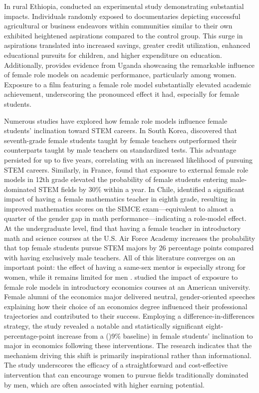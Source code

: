 In rural Ethiopia, \citet{bernard_future_nodate} conducted an experimental study demonstrating substantial impacts. Individuals randomly exposed to documentaries depicting successful agricultural or business endeavors within communities similar to their own exhibited heightened aspirations compared to the control group. This surge in aspirations translated into increased savings, greater credit utilization, enhanced educational pursuits for children, and higher expenditure on education.
Additionally, \citet{riley_role_2024} provides evidence from Uganda showcasing the remarkable influence of female role models on academic performance, particularly among women. Exposure to a film featuring a female role model substantially elevated academic achievement, underscoring the pronounced effect it had, especially for female students.

Numerous studies have explored how female role models influence female students’ inclination toward STEM careers. In South Korea, \citet{lim_persistent_2020} discovered that seventh-grade female students taught by female teachers outperformed their counterparts taught by male teachers on standardized tests. This advantage persisted for up to five years, correlating with an increased likelihood of pursuing STEM careers. Similarly, in France, \citet{breda_female_2020} found that exposure to external female role models in 12th grade elevated the probability of female students entering male-dominated STEM fields by 30\% within a year. In Chile, \citet{paredes_teacher_2014} identified a significant impact of having a female mathematics teacher in eighth grade, resulting in improved mathematics scores on the SIMCE exam—equivalent to almost a quarter of the gender gap in math performance—indicating a role-model effect.
At the undergraduate level, \citet{carrell_sex_2010} find that having a female teacher in introductory math and science courses at the U.S. Air Force Academy increases the probability that top female students pursue STEM majors by 26 percentage points compared with having exclusively male teachers. All of this literature converges on an important point: the effect of having a same-sex mentor is especially strong for women, while it remains limited for men \citep{carrell_sex_2010,paredes_teacher_2014}.
\citet{porter_gender_2020} studied the impact of exposure to female role models in introductory economics courses at an American university. Female alumni of the economics major delivered neutral, gender-oriented speeches explaining how their choice of an economics degree influenced their professional trajectories and contributed to their success. Employing a difference-in-differences strategy, the study revealed a notable and statistically significant eight-percentage-point increase from a ()9\% baseline) in female students’ inclination to major in economics following these interventions. The research indicates that the mechanism driving this shift is primarily inspirational rather than informational. The study underscores the efficacy of a straightforward and cost-effective intervention that can encourage women to pursue fields traditionally dominated by men, which are often associated with higher earning potential.


